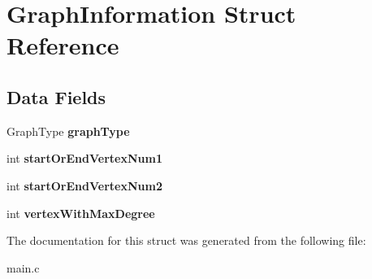 \hypertarget{structGraphInformation}{}\section{Graph\+Information Struct Reference}
\label{structGraphInformation}
\subsection*{Data Fields}
\begin{DoxyCompactItemize}
\item 
Graph\+Type {\bfseries graph\+Type}\hypertarget{structGraphInformation_a525b30e8a6065f7a4f586c3ec07312e6}{}\label{structGraphInformation_a525b30e8a6065f7a4f586c3ec07312e6}

\item 
int {\bfseries start\+Or\+End\+Vertex\+Num1}\hypertarget{structGraphInformation_a724f3a89e48c6fc29ba45e0df0b319e4}{}\label{structGraphInformation_a724f3a89e48c6fc29ba45e0df0b319e4}

\item 
int {\bfseries start\+Or\+End\+Vertex\+Num2}\hypertarget{structGraphInformation_a0833742e1c1241684231ad082661e514}{}\label{structGraphInformation_a0833742e1c1241684231ad082661e514}

\item 
int {\bfseries vertex\+With\+Max\+Degree}\hypertarget{structGraphInformation_aa5040463d22d2a57806c7276767f8371}{}\label{structGraphInformation_aa5040463d22d2a57806c7276767f8371}

\end{DoxyCompactItemize}


The documentation for this struct was generated from the following file\+:\begin{DoxyCompactItemize}
\item 
main.\+c\end{DoxyCompactItemize}
